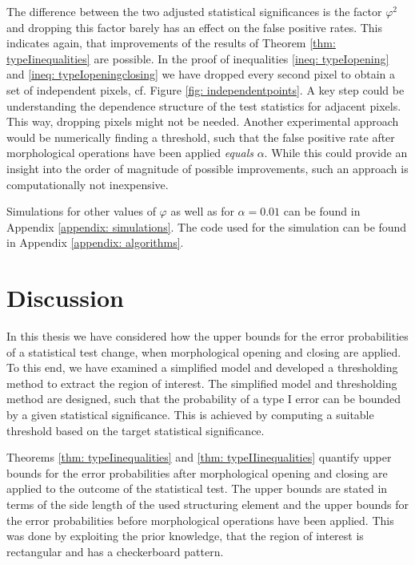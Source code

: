 \documentclass[a4paper,12pt]{article}
\theoremstyle{plain}
\theoremstyle{definition}
\numberwithin{equation}{section}
\begin{document}
The difference between the two adjusted statistical significances is the factor $\varphi^2$ and dropping this factor barely has an effect on the false positive rates. This indicates again, that improvements of the results of Theorem \ref{thm: typeIinequalities} are possible. In the proof of inequalities \eqref{ineq: typeIopening} and \eqref{ineq: typeIopeningclosing} we have dropped every second pixel to obtain a set of independent pixels, cf. Figure \ref{fig: independentpoints}. A key step could be understanding the dependence structure of the test statistics for adjacent pixels. This way, dropping pixels might not be needed. Another experimental approach would be numerically finding a threshold, such that the false positive rate after morphological operations have been applied \emph{equals} $\alpha$. While this could provide an insight into the order of magnitude of possible improvements, such an approach is computationally not inexpensive.

Simulations for other values of $\varphi$ as well as for $\alpha = 0.01$ can be found in Appendix \ref{appendix: simulations}. The code used for the simulation can be found in Appendix \ref{appendix: algorithms}.



\newpage



\section{Discussion}\label{section: conclusion}

In this thesis we have considered how the upper bounds for the error probabilities of a statistical test change, when morphological opening and closing are applied. To this end, we have examined a simplified model and developed a thresholding method to extract the region of interest. The simplified model and thresholding method are designed, such that the probability of a type I error can be bounded by a given statistical significance. This is achieved by computing a suitable threshold based on the target statistical significance.

Theorems \ref{thm: typeIinequalities} and \ref{thm: typeIIinequalities} quantify upper bounds for the error probabilities after morphological opening and closing are applied to the outcome of the statistical test. The upper bounds are stated in terms of the side length of the used structuring element and the upper bounds for the error probabilities before morphological operations have been applied. This was done by exploiting the prior knowledge, that the region of interest is rectangular and has a checkerboard pattern.
\end{document}
